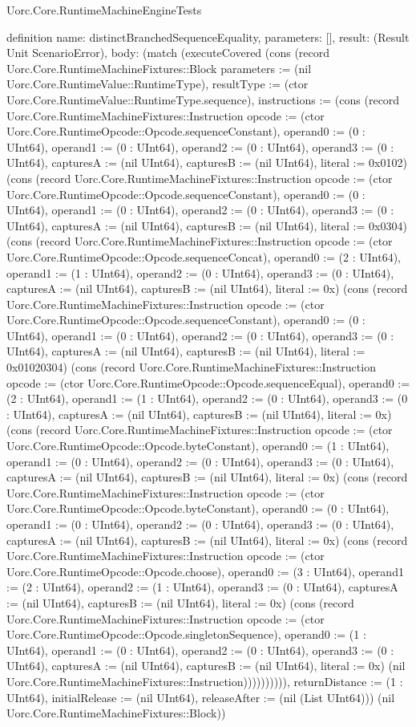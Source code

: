 \begin{lexlean}{Uorc.Core.RuntimeMachineEngineTests}
\begin{semanticmodule}
definition{
  name: distinctBranchedSequenceEquality,
  parameters: [],
  result: (Result Unit ScenarioError),
  body: (match (executeCovered (cons (record Uorc.Core.RuntimeMachineFixtures::Block {parameters := (nil Uorc.Core.RuntimeValue::RuntimeType), resultType := (ctor Uorc.Core.RuntimeValue::RuntimeType.sequence), instructions := (cons (record Uorc.Core.RuntimeMachineFixtures::Instruction {opcode := (ctor Uorc.Core.RuntimeOpcode::Opcode.sequenceConstant), operand0 := (0 : UInt64), operand1 := (0 : UInt64), operand2 := (0 : UInt64), operand3 := (0 : UInt64), capturesA := (nil UInt64), capturesB := (nil UInt64), literal := 0x0102}) (cons (record Uorc.Core.RuntimeMachineFixtures::Instruction {opcode := (ctor Uorc.Core.RuntimeOpcode::Opcode.sequenceConstant), operand0 := (0 : UInt64), operand1 := (0 : UInt64), operand2 := (0 : UInt64), operand3 := (0 : UInt64), capturesA := (nil UInt64), capturesB := (nil UInt64), literal := 0x0304}) (cons (record Uorc.Core.RuntimeMachineFixtures::Instruction {opcode := (ctor Uorc.Core.RuntimeOpcode::Opcode.sequenceConcat), operand0 := (2 : UInt64), operand1 := (1 : UInt64), operand2 := (0 : UInt64), operand3 := (0 : UInt64), capturesA := (nil UInt64), capturesB := (nil UInt64), literal := 0x}) (cons (record Uorc.Core.RuntimeMachineFixtures::Instruction {opcode := (ctor Uorc.Core.RuntimeOpcode::Opcode.sequenceConstant), operand0 := (0 : UInt64), operand1 := (0 : UInt64), operand2 := (0 : UInt64), operand3 := (0 : UInt64), capturesA := (nil UInt64), capturesB := (nil UInt64), literal := 0x01020304}) (cons (record Uorc.Core.RuntimeMachineFixtures::Instruction {opcode := (ctor Uorc.Core.RuntimeOpcode::Opcode.sequenceEqual), operand0 := (2 : UInt64), operand1 := (1 : UInt64), operand2 := (0 : UInt64), operand3 := (0 : UInt64), capturesA := (nil UInt64), capturesB := (nil UInt64), literal := 0x}) (cons (record Uorc.Core.RuntimeMachineFixtures::Instruction {opcode := (ctor Uorc.Core.RuntimeOpcode::Opcode.byteConstant), operand0 := (1 : UInt64), operand1 := (0 : UInt64), operand2 := (0 : UInt64), operand3 := (0 : UInt64), capturesA := (nil UInt64), capturesB := (nil UInt64), literal := 0x}) (cons (record Uorc.Core.RuntimeMachineFixtures::Instruction {opcode := (ctor Uorc.Core.RuntimeOpcode::Opcode.byteConstant), operand0 := (0 : UInt64), operand1 := (0 : UInt64), operand2 := (0 : UInt64), operand3 := (0 : UInt64), capturesA := (nil UInt64), capturesB := (nil UInt64), literal := 0x}) (cons (record Uorc.Core.RuntimeMachineFixtures::Instruction {opcode := (ctor Uorc.Core.RuntimeOpcode::Opcode.choose), operand0 := (3 : UInt64), operand1 := (2 : UInt64), operand2 := (1 : UInt64), operand3 := (0 : UInt64), capturesA := (nil UInt64), capturesB := (nil UInt64), literal := 0x}) (cons (record Uorc.Core.RuntimeMachineFixtures::Instruction {opcode := (ctor Uorc.Core.RuntimeOpcode::Opcode.singletonSequence), operand0 := (1 : UInt64), operand1 := (0 : UInt64), operand2 := (0 : UInt64), operand3 := (0 : UInt64), capturesA := (nil UInt64), capturesB := (nil UInt64), literal := 0x}) (nil Uorc.Core.RuntimeMachineFixtures::Instruction)))))))))), returnDistance := (1 : UInt64), initialRelease := (nil UInt64), releaseAfter := (nil (List UInt64))}) (nil Uorc.Core.RuntimeMachineFixtures::Block)) }
\end{semanticmodule}
\end{lexlean}
